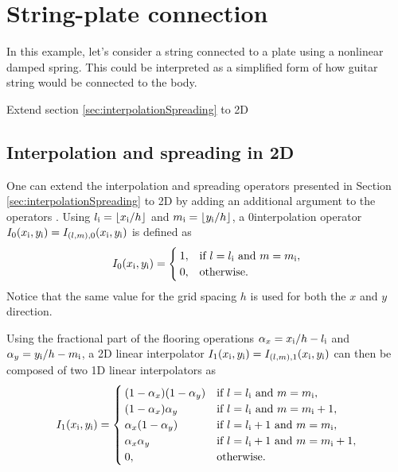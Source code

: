 \section{String-plate connection}\label{sec:stringPlateConnection}
In this example, let's consider a string connected to a plate using a nonlinear damped spring. This could be interpreted as a simplified form of how guitar string would be connected to the body. 

Extend section \ref{sec:interpolationSpreading} to 2D 

\subsection{Interpolation and spreading in 2D}\label{sec:interpolationSpreading2D}
One can extend the interpolation and spreading operators presented in Section \ref{sec:interpolationSpreading} to 2D by adding an additional argument to the operators \cite{theBible}. Using $l_\itxt = \floor[x_\itxt / h]$ and $m_\itxt = \floor[y_\itxt / h]$, a $0$\thOrder interpolation operator $I_0(x_{\text{i}}, y_{\text{i}}) = I_{(l, m), 0}(x_{\text{i}}, y_{\text{i}})$ is defined as
\begin{equation}
    I_0(x_{\text{i}}, y_{\text{i}}) = \begin{cases}
        1, & \text{if } l = l_{\text{i}} \text{ and } m = m_{\text{i}},\\
        0, & \text{otherwise}.
    \end{cases}
\end{equation}
Notice that the same value for the grid spacing $h$ is used for both the $x$ and $y$ direction.

Using the fractional part of the flooring operations $\alpha_x = x_{\text{i}}/h - l_{\text{i}}$ and $\alpha_y= y_{\text{i}}/h - m_{\text{i}}$, a 2D linear interpolator  $I_1(x_{\text{i}}, y_{\text{i}}) = I_{(l, m), 1}(x_{\text{i}}, y_{\text{i}})$ can then be composed of two 1D linear interpolators as
\begin{equation}
    I_1(x_{\text{i}}, y_{\text{i}}) = \begin{cases}
        (1 - \alpha_x)(1 - \alpha_y)& \text{if } l = l_{\text{i}} \text{ and } m = m_{\text{i}}, \\
        (1 - \alpha_x)\alpha_y& \text{if } l = l_{\text{i}} \text{ and } m = m_{\text{i}} + 1, \\
        \alpha_x(1 - \alpha_y)& \text{if } l = l_{\text{i}} + 1 \text{ and } m = m_{\text{i}}, \\
        \alpha_x\alpha_y& \text{if } l = l_{\text{i}}+1 \text{ and } m = m_{\text{i}}+1, \\
        0, & \text{otherwise}.
    \end{cases}
\end{equation}
